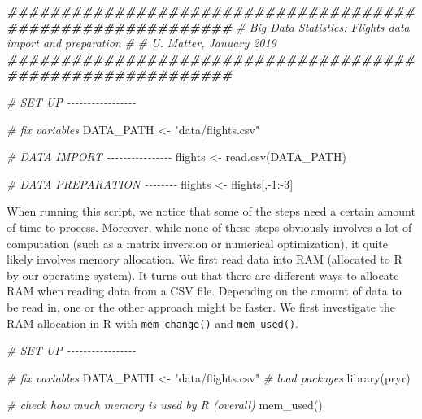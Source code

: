 \documentclass[
  12pt,
]{style/krantz}
\newenvironment{Shaded}{\begin{snugshade}}{\end{snugshade}}
\newcommand{\CommentTok}[1]{\textcolor[rgb]{0.56,0.35,0.01}{\textit{#1}}}
\newcommand{\DecValTok}[1]{\textcolor[rgb]{0.00,0.00,0.81}{#1}}
\newcommand{\DocumentationTok}[1]{\textcolor[rgb]{0.56,0.35,0.01}{\textbf{\textit{#1}}}}
\newcommand{\FunctionTok}[1]{\textcolor[rgb]{0.00,0.00,0.00}{#1}}
\newcommand{\NormalTok}[1]{#1}
\newcommand{\OtherTok}[1]{\textcolor[rgb]{0.56,0.35,0.01}{#1}}
\newcommand{\SpecialCharTok}[1]{\textcolor[rgb]{0.00,0.00,0.00}{#1}}
\newcommand{\StringTok}[1]{\textcolor[rgb]{0.31,0.60,0.02}{#1}}
\begin{document}
\begin{Shaded}
\begin{Highlighting}[]
\DocumentationTok{\#\#\#\#\#\#\#\#\#\#\#\#\#\#\#\#\#\#\#\#\#\#\#\#\#\#\#\#\#\#\#\#\#\#\#\#\#\#\#\#\#\#\#\#\#\#\#\#\#\#\#\#\#\#\#\#\#\#\#}
\CommentTok{\# Big Data Statistics: Flights data import and preparation}
\CommentTok{\#}
\CommentTok{\# U. Matter, January 2019}
\DocumentationTok{\#\#\#\#\#\#\#\#\#\#\#\#\#\#\#\#\#\#\#\#\#\#\#\#\#\#\#\#\#\#\#\#\#\#\#\#\#\#\#\#\#\#\#\#\#\#\#\#\#\#\#\#\#\#\#\#\#\#\#}

\CommentTok{\# SET UP {-}{-}{-}{-}{-}{-}{-}{-}{-}{-}{-}{-}{-}{-}{-}{-}{-}}

\CommentTok{\# fix variables}
\NormalTok{DATA\_PATH }\OtherTok{\textless{}{-}} \StringTok{"data/flights.csv"}

\CommentTok{\# DATA IMPORT {-}{-}{-}{-}{-}{-}{-}{-}{-}{-}{-}{-}{-}{-}{-}{-}}
\NormalTok{flights }\OtherTok{\textless{}{-}} \FunctionTok{read.csv}\NormalTok{(DATA\_PATH)}

\CommentTok{\# DATA PREPARATION {-}{-}{-}{-}{-}{-}{-}{-}}
\NormalTok{flights }\OtherTok{\textless{}{-}}\NormalTok{ flights[,}\SpecialCharTok{{-}}\DecValTok{1}\SpecialCharTok{:{-}}\DecValTok{3}\NormalTok{]}
\end{Highlighting}
\end{Shaded}

When running this script, we notice that some of the steps need a certain amount of time to process. Moreover, while none of these steps obviously involves a lot of computation (such as a matrix inversion or numerical optimization), it quite likely involves memory allocation. We first read data into RAM (allocated to R by our operating system). It turns out that there are different ways to allocate RAM when reading data from a CSV file. Depending on the amount of data to be read in, one or the other approach might be faster. We first investigate the RAM allocation in R with \texttt{mem\_change()} and \texttt{mem\_used()}.

\begin{Shaded}
\begin{Highlighting}[]
\CommentTok{\# SET UP {-}{-}{-}{-}{-}{-}{-}{-}{-}{-}{-}{-}{-}{-}{-}{-}{-}}

\CommentTok{\# fix variables}
\NormalTok{DATA\_PATH }\OtherTok{\textless{}{-}} \StringTok{"data/flights.csv"}
\CommentTok{\# load packages}
\FunctionTok{library}\NormalTok{(pryr) }


\CommentTok{\# check how much memory is used by R (overall)}
\FunctionTok{mem\_used}\NormalTok{()}
\end{Highlighting}
\end{Shaded}
\end{document}
